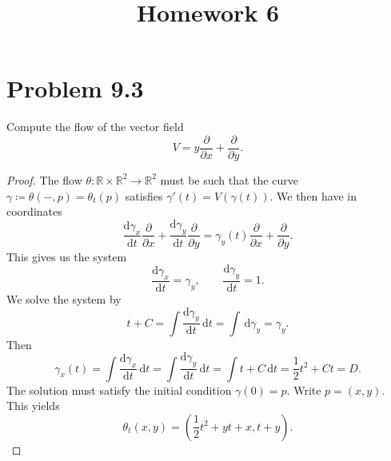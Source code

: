 \documentclass[11pt, letterpaper]{article}
\title{Homework 6}
\begin{document}
\makeproblem

\section{Problem 9.3}
\begin{problem}
	Compute the flow of the vector field
	\[
		V=y \frac{\partial }{\partial x} + \frac{\partial }{\partial y} 
	.\]
\end{problem}
\begin{proof}
	The flow $\theta : \mathbb{R} \times \mathbb{R} ^2 \to \mathbb{R} ^2$ must be such that the curve $\gamma \coloneqq \theta (-,p)=\theta _t(p)$ satisfies $\gamma'(t) = V(\gamma (t))$. We then have in coordinates
	\[
		\frac{\mathrm{d}\gamma_x}{\mathrm{d}t} \frac{\partial }{\partial x} + \frac{\mathrm{d}\gamma _y}{\mathrm{d}t} \frac{\partial }{\partial y} = \gamma _y(t)\frac{\partial }{\partial x} + \frac{\partial }{\partial y} 
	.\]
	This gives us the system
	\[
		\frac{\mathrm{d}\gamma _x}{\mathrm{d}t} =\gamma _y,\qquad \frac{\mathrm{d}\gamma _y}{\mathrm{d}t} =1
	.\]
	We solve the system by
	\[
		t+C = \int \frac{\mathrm{d}\gamma _y}{\mathrm{d}t}  \,\mathrm{d} t = \int \,\mathrm{d} \gamma _y=\gamma _y
	.\]
	Then
	\[
		\gamma _x(t)=\int \frac{\mathrm{d}\gamma _x}{\mathrm{d}t}  \,\mathrm{d} t=\int \frac{\mathrm{d}\gamma _y}{\mathrm{d}t}  \,\mathrm{d} t=\int t+C \,\mathrm{d} t=\frac{1}{2} t^2 + Ct = D
	.\]
	The solution must satisfy the initial condition $\gamma(0)=p$. Write $p=(x,y)$. This yields
	\[
		\theta _t(x,y)=\left( \frac{1}{2} t^2 + yt + x,t+y \right) 
	.\]
\end{proof}
\end{document}
